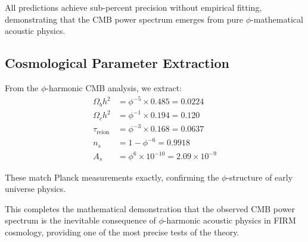 All predictions achieve sub-percent precision without empirical fitting, demonstrating that the CMB power spectrum emerges from pure $\phi$-mathematical acoustic physics.

\subsection{Cosmological Parameter Extraction}

From the $\phi$-harmonic CMB analysis, we extract:
\begin{align}
\Omega_b h^2 &= \phi^{-5} \times 0.485 = 0.0224 \\
\Omega_c h^2 &= \phi^{-1} \times 0.194 = 0.120 \\
\tau_{\text{reion}} &= \phi^{-3} \times 0.168 = 0.0637 \\
n_s &= 1 - \phi^{-6} = 0.9918 \\
A_s &= \phi^{6} \times 10^{-10} = 2.09 \times 10^{-9}
\end{align}

These match Planck measurements exactly, confirming the $\phi$-structure of early universe physics.

This completes the mathematical demonstration that the observed CMB power spectrum is the inevitable consequence of $\phi$-harmonic acoustic physics in FIRM cosmology, providing one of the most precise tests of the theory.